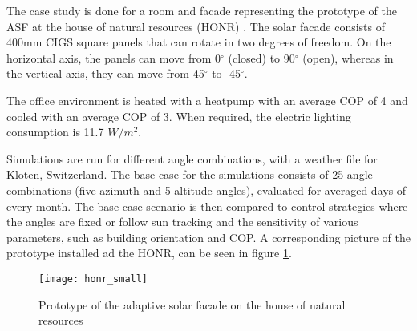 		The case study is done for a room and facade representing the prototype of the ASF at the house of natural resources (HONR) \cite{nagy2015frontiers}.  The solar facade consists of 400mm CIGS square panels that can rotate in two degrees of freedom. On the horizontal axis, the panels can move from 0$^{\circ}$ (closed) to 90$^{\circ}$ (open), whereas in the vertical axis, they can move from 45$^{\circ}$ to -45$^{\circ}$. %

		The office environment is heated with a heatpump with an average COP of 4 and cooled with an average COP of 3. When required, the electric lighting consumption is 11.7 $W/m^2$. 


		Simulations are run for different angle combinations, with a weather file for Kloten, Switzerland. The base case for the simulations consists of 25 angle combinations (five azimuth and 5 altitude angles), evaluated for averaged days of every month. The base-case scenario is then compared to control strategies where the angles are fixed or follow sun tracking and the sensitivity of various parameters, such as building orientation and COP. A corresponding picture of the prototype installed ad the HONR, can be seen in figure \ref{fig:honr}. 

		\begin{figure}[ht] %
			\begin{center}
			\texttt{[image: honr\_small]}
			\caption{Prototype of the adaptive solar facade on the house of natural resources}
			\label{fig:honr}
			\end{center} 
		\end{figure}



